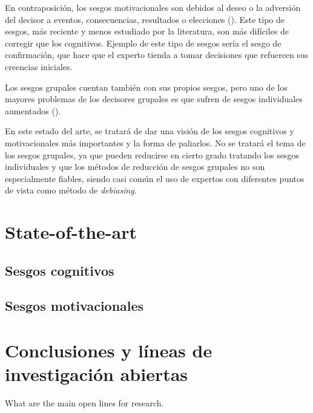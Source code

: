 \documentclass[a4paper,11pt]{article}
\begin{document}
En contraposición, los sesgos motivacionales son debidos al deseo o la adversión del decisor a eventos, consecuencias, resultados o elecciones (\cite{kunda1990}). Este tipo de sesgos, más reciente y menos estudiado por la literatura, son más difíciles de corregir que los cognitivos. Ejemplo de este tipo de sesgos sería el sesgo de confirmación, que hace que el experto tienda a tomar decisiones que refuercen sus creencias iniciales.

Los sesgos grupales cuentan también con sus propios sesgos, pero uno de los mayores problemas de los decisores grupales es que sufren de sesgos individuales aumentados (\cite{kerr2004}).

En este estado del arte, se tratará de dar una visión de los sesgos cognitivos y motivacionales más importantes y la forma de paliarlos. No se tratará el tema de los sesgos grupales, ya que pueden reducirse en cierto grado tratando los sesgos individuales y que los métodos de reducción de sesgos grupales no son especialmente fiables, siendo casi común el uso de expertos con diferentes puntos de vista como método de \textit{debiasing}.


\section{State-of-the-art}


\subsection{Sesgos cognitivos}

\subsection{Sesgos motivacionales}


\section{Conclusiones y líneas de investigación abiertas}

What are the main open lines for research.
\end{document}
